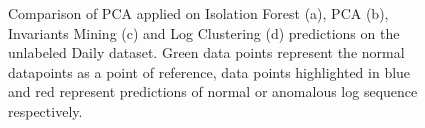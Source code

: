 \begin{figure}%
    \centering
    \qquad
     \qquad
     \qquad
    \caption{Comparison of PCA applied on Isolation Forest (a), PCA (b), Invariants Mining (c) and Log Clustering (d) predictions on the unlabeled Daily dataset. Green data points represent the normal datapoints as a point of reference, data points highlighted in blue and red represent predictions of normal or anomalous log sequence respectively.}%
    \label{fig:pca-unlabeled-plots-appendix}%
\end{figure}